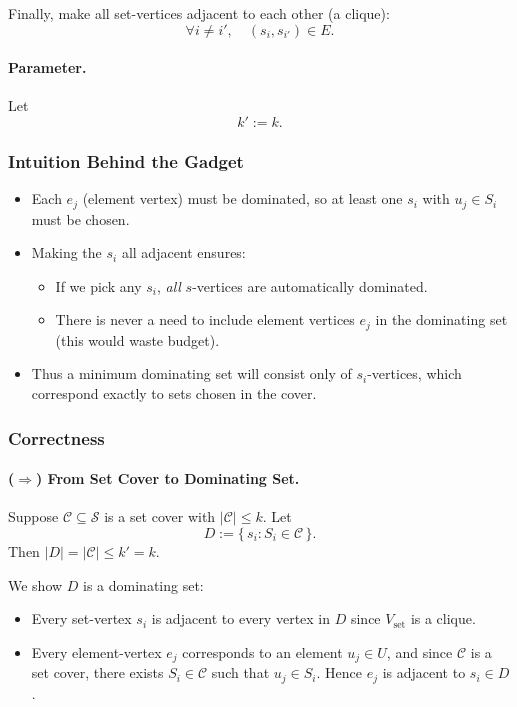 \documentclass[9pt]{extarticle}
\begin{document}
Finally, make all set-vertices adjacent to each other (a clique):
\[
    \forall i \ne i',\quad (s_i, s_{i'}) \in E.
\]

\paragraph{Parameter.}
Let
\[
    k' := k.
\]

\subsubsection*{Intuition Behind the Gadget}

\begin{itemize}
    \item Each $e_j$ (element vertex) must be dominated, so at least one
          $s_i$ with $u_j \in S_i$ must be chosen.
    \item Making the $s_i$ all adjacent ensures:
        \begin{itemize}
            \item If we pick any $s_i$, \emph{all} $s$-vertices are automatically dominated.
            \item There is never a need to include element vertices $e_j$ in
                  the dominating set (this would waste budget).
        \end{itemize}
    \item Thus a minimum dominating set will consist only of $s_i$-vertices,
          which correspond exactly to sets chosen in the cover.
\end{itemize}

\subsubsection*{Correctness}

\paragraph{($\Rightarrow$) From Set Cover to Dominating Set.}

Suppose $\mathcal{C} \subseteq \mathcal{S}$ is a set cover with $|\mathcal{C}| \le k$.
Let
\[
    D := \{\, s_i : S_i \in \mathcal{C} \,\}.
\]
Then $|D| = |\mathcal{C}| \le k' = k$.

We show $D$ is a dominating set:

\begin{itemize}
    \item Every set-vertex $s_i$ is adjacent to every vertex in $D$ since
          $V_{\text{set}}$ is a clique.
    \item Every element-vertex $e_j$ corresponds to an element $u_j \in U$, and
          since $\mathcal{C}$ is a set cover, there exists $S_i \in \mathcal{C}$
          such that $u_j \in S_i$.  Hence $e_j$ is adjacent to $s_i \in D$.
\end{itemize}
\end{document}
